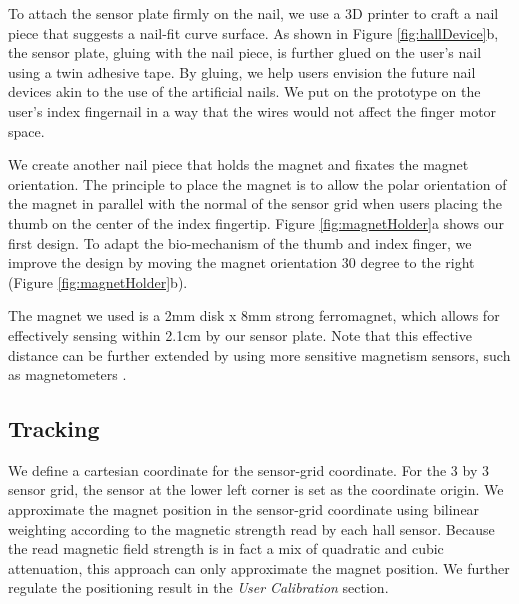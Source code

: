To attach the sensor plate firmly on the nail, we use a 3D printer to craft a nail piece that suggests a nail-fit curve surface. 
As shown in Figure \ref{fig:hallDevice}b, the sensor plate, gluing with the nail piece, is further glued on the user's nail using a twin adhesive tape. 
By gluing, we help users envision the future nail devices akin to the use of the artificial nails.
We put on the prototype on the user's index fingernail in a way that the wires would not affect the finger motor space.

We create another nail piece that holds the magnet and fixates the magnet orientation. 
The principle to place the magnet is to allow the polar orientation of the magnet in parallel with the normal of the sensor grid when users placing the thumb on the center of the index fingertip. 
Figure \ref{fig:magnetHolder}a shows our first design. 
To adapt the bio-mechanism of the thumb and index finger, we improve the design by moving the magnet orientation 30 degree to the right (Figure \ref{fig:magnetHolder}b). 

The magnet we used is a 2mm disk x 8mm strong ferromagnet, which allows for effectively sensing within 2.1cm by our sensor plate.
Note that this effective distance can be further extended by using more sensitive magnetism sensors, such as magnetometers \cite{Ashbrook:2011}.





\subsection{Tracking}
We define a cartesian coordinate for the sensor-grid coordinate. 
For the 3 by 3 sensor grid, the sensor at the lower left corner is set as the coordinate origin. 
We approximate the magnet position in the sensor-grid coordinate using bilinear weighting according to the magnetic strength read by each hall sensor. 
Because the read magnetic field strength is in fact a mix of quadratic and cubic attenuation, this approach can only approximate the magnet position. 
We further regulate the positioning result in the \emph{User Calibration} section.

